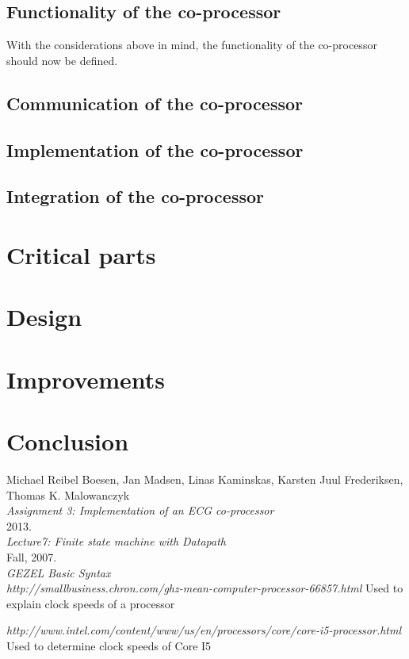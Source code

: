 \documentclass[12pt,a4paper]{article}
\begin{document}
\subsection{Functionality of the co-processor}
		With the considerations above in mind, the functionality of the co-processor should now be defined.
		
\subsection{Communication of the co-processor}

\subsection{Implementation of the co-processor}

\subsection{Integration of the co-processor}
	
\section{Critical parts}


\section{Design}

	
\section{Improvements}

\section{Conclusion}

\newpage
\begin{thebibliography}{9}

  Michael Reibel Boesen, Jan Madsen, Linas Kaminskas, Karsten Juul Frederiksen, Thomas K. Malowanczyk\\
  \emph{Assignment 3: Implementation of an ECG co-processor}\\
  2013.\\

  \emph{Lecture7: Finite state machine with Datapath}\\
  Fall, 2007.\\

  \emph{GEZEL Basic Syntax}\\
  
  \emph{http://smallbusiness.chron.com/ghz-mean-computer-processor-66857.html}
  Used to explain clock speeds of a processor
  
  \emph{http://www.intel.com/content/www/us/en/processors/core/core-i5-processor.html}
  Used to determine clock speeds of Core I5
  
\end{thebibliography}
	
\end{document}
